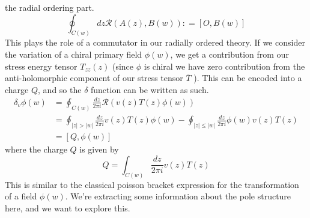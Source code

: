 \documentclass[11pt, oneside]{article}   	%
\theoremstyle{slanted}
\begin{document}
the radial ordering part. 
\[
	\oint_{ C \left(  w  \right)  } 
	dz \mathcal{ R } \left( A \left(   z \right)  , 
	B \left(  w  \right)   \right)  : = 
	\left[  O , B \left(  w  \right)   \right] 
\] This plays the role of a 
commutator in our radially ordered theory. 
If we consider the variation of a 
chiral primary field 
$ \phi \left(  w  \right)  $, 
we get a contribution 
from our stress energy tensor $ T_{ zz } \left(   z  \right)   $ 
(since $ \phi $ is chiral we have zero contribution from 
the anti-holomorphic component of our stress tensor $ \overline{T }  $ ). 
This can be encoded into a 
charge $ Q$, and so the $ \delta $ function 
can be written as such. 
\begin{align*}
	 \delta _ v \phi \left(  w  \right)  
	 &=  \oint _{ C \left(  w  \right)  } 
	 \frac{ d z }{ 2 \pi i } \mathcal{ R } \left( v 
	 \left(  z  \right)  T \left(  z  \right)  \phi \left(  w  \right)  \right)  \\
	 &=  \oint_{ | z |  >  | w |      }
	 \frac{d z }{ 2 \pi i  } v \left(  z  \right)  T \left( z   \right)  
	 \phi \left(  w  \right)   - \oint_{ 
	  | z | \leq | w |  } \frac{ d z }{ 2 \pi i } 
	  \phi \left( w  \right)  v \left(  z  \right)  T \left(  z  \right)  \\
	  &=  \left[  Q , \phi \left(  w  \right)  \right] 
\end{align*}
where the charge $ Q $ is given 
by 
\[
	Q = \int_{ C \left(  w  \right)  } 
	\frac{ d z }{ 2 \pi i } v \left(  z  \right)  T \left(  z  \right) 
\] This is similar to 
the classical poisson bracket expression 
for the transformation of a field $ \phi \left(  w  \right)  $. 
We're extracting 
some information about the pole structure here, 
and we want to explore this. 
\end{document}
